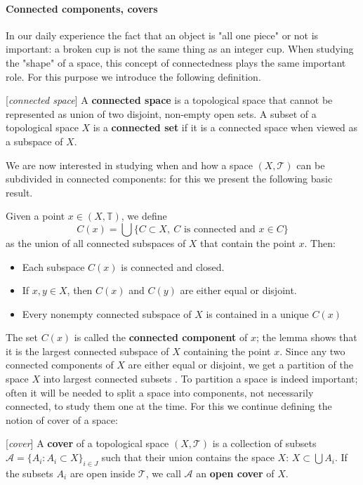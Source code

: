 \paragraph{Connected components, covers}
In our daily experience the fact that an object is "all one piece" or not is important: a broken cup is not the same thing as an integer cup. When studying the "shape" of a space, this concept of connectedness plays the same important role.  For this purpose we introduce the following definition.
\begin{definition}{[\textit{connected space}]}
	A \textbf{connected space} is a topological space that cannot be represented as union of two disjoint, non-empty open sets. A subset of a topological space $X$ is a \textbf{connected set} if it is a connected space when viewed as a subspace of $X$.
\end{definition}
We are now interested in studying when and how a space $(X,\mathcal{T})$ can be subdivided in connected components: for this we present the following basic result.
\begin{lemma}
	Given a point $x \in (X,\mathbb{T})$, we define
	$$ C(x) = \bigcup \{ C \subset X,\  C \text{ is connected and } x \in C \} $$
	as the union of all connected subspaces of $X$ that contain the point $x$. Then:
	\begin{itemize}
		\item Each subspace $C(x)$ is connected and closed.
		\item If $x, y \in X$, then $C(x)$ and $C(y)$ are either equal or disjoint.
		\item Every nonempty connected subspace of $X$ is contained in a unique $C(x)$
	\end{itemize}
	\label{theo:connected_components}
\end{lemma}
The set $C(x)$ is called the \textbf{connected component} of $x$; the lemma shows that it is the largest connected subspace of $X$ containing the point $x$. Since any two connected components of $X$ are either equal or disjoint, we get a partition of the space $X$ into largest connected subsets \cite{Schnell}.\newline
To partition a space is indeed important; often it will be needed to split a space into components, not necessarily connected, to study them one at the time. For this we continue defining the notion of cover of a space:
\begin{definition}{[\textit{cover}]}
	A \textbf{cover} of a topological space $(X,\mathcal{T})$ is a collection of subsets $\mathcal{A}=\{A_i: A_i \subset X\}_{i \in J}$ such that their union contains the space $X$:  $X\subset \bigcup A_i$. If the subsets $A_i$ are open inside $\mathcal{T}$, we call $\mathcal{A}$ an \textbf{open cover} of $X$.
\end{definition}

